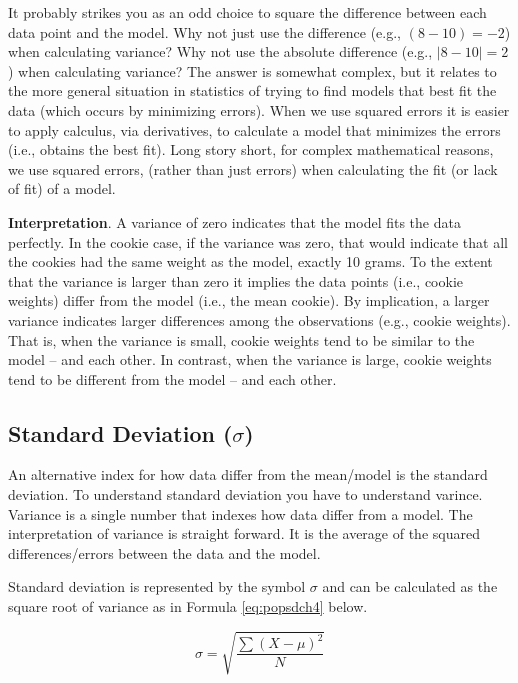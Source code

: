 \documentclass[
]{krantz}
\begin{document}
It probably strikes you as an odd choice to square the difference between each data point and the model. Why not just use the difference (e.g., \((8 - 10) = -2\)) when calculating variance? Why not use the absolute difference (e.g., \(|8 - 10|= 2\)) when calculating variance? The answer is somewhat complex, but it relates to the more general situation in statistics of trying to find models that best fit the data (which occurs by minimizing errors). When we use squared errors it is easier to apply calculus, via derivatives, to calculate a model that minimizes the errors (i.e., obtains the best fit). Long story short, for complex mathematical reasons, we use squared errors, (rather than just errors) when calculating the fit (or lack of fit) of a model.

\textbf{Interpretation}. A variance of zero indicates that the model fits the data perfectly. In the cookie case, if the variance was zero, that would indicate that all the cookies had the same weight as the model, exactly 10 grams. To the extent that the variance is larger than zero it implies the data points (i.e., cookie weights) differ from the model (i.e., the mean cookie). By implication, a larger variance indicates larger differences among the observations (e.g., cookie weights). That is, when the variance is small, cookie weights tend to be similar to the model -- and each other. In contrast, when the variance is large, cookie weights tend to be different from the model -- and each other.

\hypertarget{standard-deviation-sigma}{%
\subsection{\texorpdfstring{Standard Deviation (\(\sigma\))}{Standard Deviation (\textbackslash sigma)}}\label{standard-deviation-sigma}}

An alternative index for how data differ from the mean/model is the standard deviation. To understand standard deviation you have to understand varince. Variance is a single number that indexes how data differ from a model. The interpretation of variance is straight forward. It is the average of the squared differences/errors between the data and the model.

Standard deviation is represented by the symbol \(\sigma\) and can be calculated as the square root of variance as in Formula \eqref{eq:popsdch4} below.

\begin{equation} 
\sigma = \sqrt{\frac{\sum{(X - \mu)^2}}{N}}
      \label{eq:popsdch4}
\end{equation}
\end{document}
